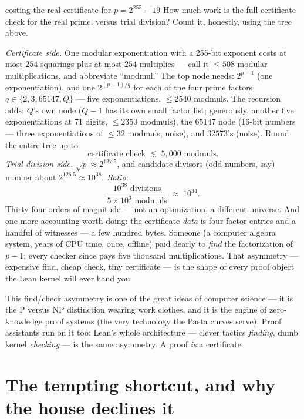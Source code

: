 \begin{worked}{costing the real certificate for $p = 2^{255}-19$}
How much work is the full certificate check for the real prime, versus
trial division? Count it, honestly, using the tree above.

\emph{Certificate side.} One modular exponentiation with a 255-bit
exponent costs at most $254$ squarings plus at most $254$ multiplies ---
call it $\le 508$ modular multiplications, and abbreviate ``modmul.''
The top node needs: $2^{p-1}$ (one exponentiation), and one
$2^{(p-1)/q}$ for each of the four prime factors $q \in \{2, 3, 65147,
Q\}$ --- five exponentiations, $\le 2540$ modmuls. The recursion adds:
$Q$'s own node ($Q-1$ has its own small factor list; generously, another
five exponentiations at 71 digits, $\le 2350$ modmuls), the $65147$ node
(16-bit numbers --- three exponentiations of $\le 32$ modmuls, noise),
and $32573$'s (noise). Round the entire tree up to
\[
\text{certificate check} \;\lesssim\; 5{,}000 \text{ modmuls.}
\]
\emph{Trial division side.} $\sqrt{p} \approx 2^{127.5}$, and candidate
divisors (odd numbers, say) number about $2^{126.5} \approx 10^{38}$.
\emph{Ratio}:
\[
\frac{10^{38} \text{ divisions}}{5 \times 10^{3} \text{ modmuls}}
\;\approx\; 10^{34}.
\]
Thirty-four orders of magnitude --- not an optimization, a different
universe. And one more accounting worth doing: the certificate
\emph{data} is four factor entries and a handful of witnesses --- a few
hundred bytes. Someone (a computer algebra system, years of CPU time,
once, offline) paid dearly to \emph{find} the factorization of $p-1$;
every checker since pays five thousand multiplications. That asymmetry
--- expensive find, cheap check, tiny certificate --- is the shape of
every proof object the Lean kernel will ever hand you.
\end{worked}

\begin{aha}
This find/check asymmetry is one of the great ideas of computer science ---
it is the P versus NP distinction wearing work clothes, and it is the engine
of zero-knowledge proof systems (the very technology the Pasta curves serve).
Proof assistants run on it too: Lean's whole architecture --- clever tactics
\emph{finding}, dumb kernel \emph{checking} --- is the same asymmetry. A
proof \emph{is} a certificate.
\end{aha}

\section{The tempting shortcut, and why the house declines it}

